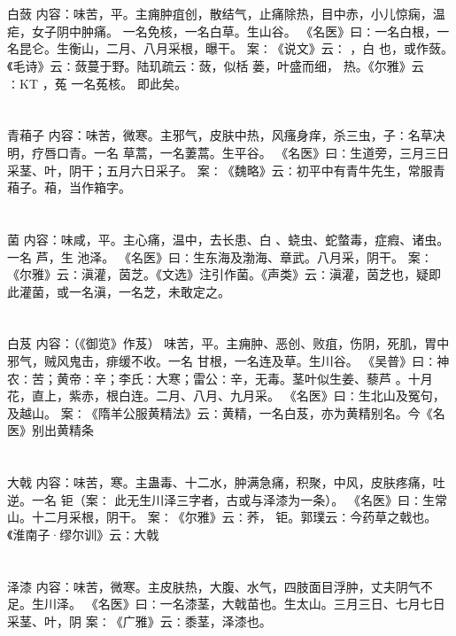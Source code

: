 \documentclass[12pt,UTF8]{ctexbook}
\begin{document}
\section{}白蔹
内容：味苦，平。主痈肿疽创，散结气，止痛除热，目中赤，小儿惊痫，温疟，女子阴中肿痛。 
一名免核，一名白草。生山谷。 
《名医》曰∶一名白根，一名昆仑。生衡山，二月、八月采根，曝干。 
案∶《说文》云∶ ，白 也，或作蔹。《毛诗》云∶蔹蔓于野。陆玑疏云∶蔹，似栝 
蒌，叶盛而细， 
热。《尔雅》云∶KT ，菟 
一名菟核。 
即此矣。 


\section{}青葙子
内容：味苦，微寒。主邪气，皮肤中热，风瘙身痒，杀三虫，子∶名草决明，疗唇口青。一名 
草蒿，一名萋蒿。生平谷。 
《名医》曰∶生道旁，三月三日采茎、叶，阴干；五月六日采子。 
案∶《魏略》云∶初平中有青牛先生，常服青葙子。葙，当作箱字。 


\section{}菌
内容：味咸，平。主心痛，温中，去长患、白 、蛲虫、蛇螫毒，症瘕、诸虫。一名 芦，生 
池泽。 
《名医》曰∶生东海及渤海、章武。八月采，阴干。 
案∶《尔雅》云∶滇灌，茵芝。《文选》注引作菌。《声类》云∶滇灌，茵芝也，疑即 
此灌菌，或一名滇，一名芝，未敢定之。 


\section{}白芨
内容：（《御览》作芨） 
味苦，平。主痈肿、恶创、败疽，伤阴，死肌，胃中邪气，贼风鬼击，痱缓不收。一名 
甘根，一名连及草。生川谷。 
《吴普》曰∶神农∶苦；黄帝∶辛；李氏∶大寒；雷公∶辛，无毒。茎叶似生姜、藜芦 
。十月花，直上，紫赤，根白连。二月、八月、九月采。 
《名医》曰∶生北山及冤句，及越山。 
案∶《隋羊公服黄精法》云∶黄精，一名白芨，亦为黄精别名。今《名医》别出黄精条 


\section{}大戟
内容：味苦，寒。主蛊毒、十二水，肿满急痛，积聚，中风，皮肤疼痛，吐逆。一名 钜（案∶ 
此无生川泽三字者，古或与泽漆为一条）。 
《名医》曰∶生常山。十二月采根，阴干。 
案∶《尔雅》云∶荞， 钜。郭璞云∶今药草之戟也。《淮南子·缪尔训》云∶大戟 


\section{}泽漆
内容：味苦，微寒。主皮肤热，大腹、水气，四肢面目浮肿，丈夫阴气不足。生川泽。 
《名医》曰∶一名漆茎，大戟苗也。生太山。三月三日、七月七日采茎、叶，阴 
案∶《广雅》云∶黍茎，泽漆也。 
\end{document}
